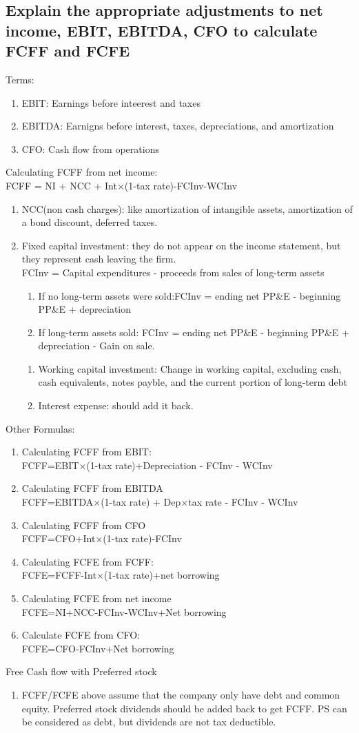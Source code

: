 \documentclass{article}
\newcommand{\be}{\begin{enumerate}}
\newcommand{\ee}{\end{enumerate}}
\begin{document}
\subsection{Explain the appropriate adjustments to net income, EBIT, EBITDA, CFO to calculate
FCFF and FCFE}
Terms:
\be
    \item EBIT: Earnings before inteerest and taxes
    \item EBITDA: Earnigns before interest, taxes, depreciations, and amortization
    \item CFO: Cash flow from operations
\ee
Calculating FCFF from net income: 
\\FCFF = NI + NCC + Int$\times$(1-tax rate)-FCInv-WCInv
\be
    \item NCC(non cash charges): like amortization of intangible assets, amortization of a bond discount, 
        deferred taxes.
    \item Fixed capital investment: they do not appear on the income statement, but they represent
        cash leaving the firm.
        \\FCInv = Capital expenditures - proceeds from sales of long-term assets
        \be
            \item If no long-term assets were sold:FCInv = ending net PP\&E - beginning PP\&E + depreciation
            \item If long-term assets sold: FCInv = ending net PP\&E - beginning PP\&E + depreciation - Gain on sale.
        \ee
        \be
            \item Working capital investment: Change in working capital, excluding cash, cash equivalents, notes payble, 
                and the current portion of long-term debt
            \item Interest expense: should add it back.
        \ee
\ee
Other Formulas:
\be
    \item Calculating FCFF from EBIT:
    \\FCFF=EBIT$\times$(1-tax rate)+Depreciation - FCInv - WCInv
    \item Calculating FCFF from EBITDA
        \\FCFF=EBITDA$\times$(1-tax rate) + Dep$\times$tax rate - FCInv - WCInv
    \item Calculating FCFF from CFO
        \\FCFF=CFO+Int$\times$(1-tax rate)-FCInv
    \item Calculating FCFE from FCFF:
        \\FCFE=FCFF-Int$\times$(1-tax rate)+net borrowing
    \item Calculating FCFE from net income
        \\FCFE=NI+NCC-FCInv-WCInv+Net borrowing
    \item Calculate FCFE from CFO:
        \\FCFE=CFO-FCInv+Net borrowing
\ee
Free Cash flow with Preferred stock
\be
\item FCFF/FCFE above assume that the company only have debt and common equity.
Preferred stock dividends should be added back to get FCFF. PS can be considered as
debt, but dividends are not tax deductible.
\ee
\end{document}
